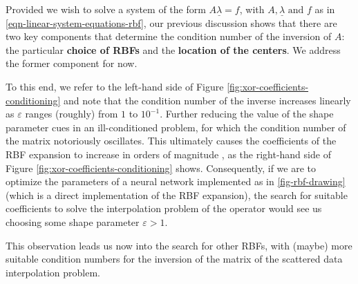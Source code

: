 \documentclass[12pt]{report} %
\newcommand{\tmstrong}[1]{\textbf{#1}}
\newcommand{\tmverbatim}[1]{\text{{\ttfamily{#1}}}}
\begin{document}
Provided we wish to solve a system of the form $A \underline{\lambda} = f$,
with $A, \underline{\lambda} \text{ and } f$ as in
\eqref{eqn-linear-system-equations-rbf}, our previous discussion shows that there
are two key components that determine the condition number of the inversion of
$A$: the particular {\tmstrong{choice of RBFs}} and the {\tmstrong{location of
the centers}}. We address the former component for now.

To this end, we refer to the left-hand side of Figure
\ref{fig:xor-coefficients-conditioning} and note that the condition number of
the inverse increases linearly as $\varepsilon$ ranges (roughly) from $1$ to
$10^{- 1}$. Further reducing the value of the shape parameter cues in an
ill-conditioned problem, for which the condition number of the matrix
notoriously oscillates. This ultimately causes the coefficients of the RBF
expansion to increase in orders of magnitude {\cite{fornberg2015primer}}, as
the right-hand side of Figure \ref{fig:xor-coefficients-conditioning} shows.
Consequently, if we are to optimize the parameters of a neural network
implemented as in \ref{fig-rbf-drawing} (which is a direct implementation of
the RBF expansion), the search for suitable coefficients to solve the
interpolation problem of the \tmverbatim{xor} operator would see us choosing
some shape parameter $\varepsilon > 1$.

This observation leads us now into the search for other RBFs, with (maybe)
more suitable condition numbers for the inversion of the matrix of the
scattered data interpolation problem.
\end{document}
